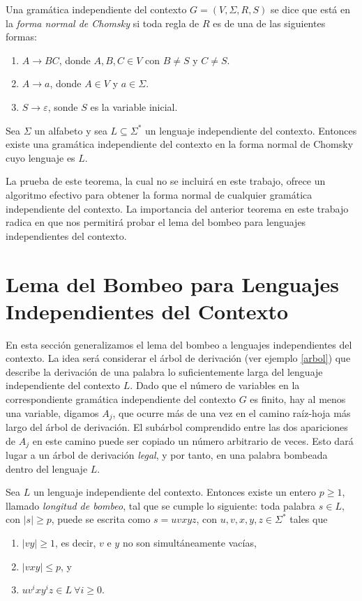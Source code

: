 \documentclass[twoside]{article}
\begin{document}
\begin{defi}
Una gramática independiente del contexto $G=(V,\Sigma,R,S)$ se dice que está en la \emph{forma normal de Chomsky} si toda regla de $R$ es de una de las siguientes formas:
\begin{enumerate}
\item $A\to BC$, donde $A,B,C\in V$ con $B\neq S$ y $C\neq S$. 
\item $A\to a$, donde $A\in V$ y $a\in\Sigma$.
\item $S\to\varepsilon$, sonde $S$ es la variable inicial. 
\end{enumerate}
\end{defi}

\begin{teorema}\label{chomsky}
Sea $\Sigma$ un alfabeto y sea $L\subseteq\Sigma^*$ un lenguaje independiente del contexto. Entonces existe una gramática independiente del contexto en la forma normal de Chomsky cuyo lenguaje es $L$. 
\end{teorema}

La prueba de este teorema, la cual no se incluirá en este trabajo, ofrece un algoritmo efectivo para obtener la forma normal de cualquier gramática independiente del contexto. La importancia del anterior teorema en este trabajo radica en que nos permitirá probar el lema del bombeo para lenguajes independientes del contexto.

\section{Lema del Bombeo para Lenguajes Independientes del Contexto}
En esta sección generalizamos el lema del bombeo a lenguajes independientes del contexto. La idea será considerar el árbol de derivación (ver ejemplo \ref{arbol}) que describe la derivación de una palabra lo suficientemente larga del lenguaje independiente del contexto $L$. Dado que el número de variables en la correspondiente gramática independiente del contexto $G$ es finito, hay al menos una variable, digamos $A_j$, que ocurre más de una vez en el camino raíz-hoja más largo del árbol de derivación. El subárbol comprendido entre las dos apariciones de $A_j$ en este camino puede ser copiado un número arbitrario de veces. Esto dará lugar a un árbol de derivación \emph{legal}, y por tanto, en una palabra bombeada dentro del lenguaje $L$. 

\begin{teorema}
Sea $L$ un lenguaje independiente del contexto. Entonces existe un entero $p\geq 1$, llamado \emph{longitud de bombeo}, tal que se cumple lo siguiente: toda palabra $s\in L$, con $|s|\geq p$, puede se escrita como $s=uvxyz$, con $u,v,x,y,z\in\Sigma^*$ tales que
\begin{enumerate}
\item $|vy|\geq 1$, es decir, $v$ e $y$ no son simultáneamente vacías,
\item $|vxy|\leq p$, y
\item $uv^ixy^iz\in L\ \forall i\geq 0$.
\end{enumerate}
\end{teorema}
\end{document}

